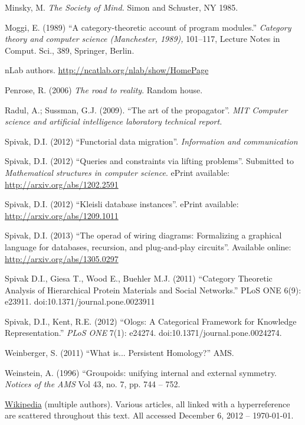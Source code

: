\documentclass[a4paper]{book}
\theoremstyle{myth}
\begin{document}
\begin{russian}
\begin{thebibliography}{SGWB}
 Minsky, M. {\em The Society of Mind.}  Simon and Schuster, NY 1985.

 Moggi, E. (1989) “A category-theoretic account of program modules.” {\em Category theory and computer science (Manchester, 1989),} 101–117, Lecture Notes in Comput. Sci., 389, Springer, Berlin. 

 nLab authors.  \url{http://ncatlab.org/nlab/show/HomePage}

 Penrose, R. (2006) {\em The road to reality}. Random house.

 Radul, A.; Sussman, G.J. (2009). “The art of the propagator”. {\em MIT Computer science and artificial intelligence laboratory technical report.}

 Spivak, D.I. (2012) “Functorial data migration”. {\em Information and communication} 

 Spivak, D.I. (2012) “Queries and constraints via lifting problems”. Submitted to {\em Mathematical structures in computer science}. ePrint available: \url{http://arxiv.org/abs/1202.2591}

 Spivak, D.I. (2012) “Kleisli database instances”. ePrint available: \url{http://arxiv.org/abs/1209.1011}

 Spivak, D.I. (2013) “The operad of wiring diagrams: Formalizing a graphical language for databases, recursion, and plug-and-play circuits”. Available online: \url{http://arxiv.org/abs/1305.0297}

 Spivak D.I., Giesa T., Wood E., Buehler M.J. (2011) “Category Theoretic Analysis of Hierarchical Protein Materials and Social Networks.” PLoS ONE 6(9): e23911. doi:10.1371/journal.pone.0023911

 Spivak, D.I., Kent, R.E. (2012) “Ologs: A Categorical Framework for Knowledge Representation.” {\em PLoS ONE} 7(1): e24274. doi:10.1371/journal.pone.0024274.

 Weinberger, S. (2011) “What is... Persistent Homology?” AMS.

 Weinstein, A. (1996) “Groupoids: unifying internal and external symmetry. {\em Notices of the AMS} Vol 43, no. 7, pp. 744 -- 752.

 \href{http://www.wikipedia.org}{\text Wikipedia} (multiple authors). Various articles, all linked with a hyperreference are scattered throughout this text. All accessed December 6, 2012 -- \today.

\end{thebibliography}
\end{russian}
\end{document}
